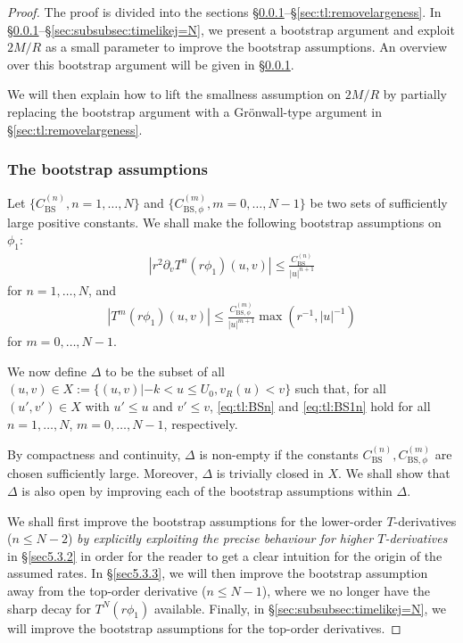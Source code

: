 \documentclass[11pt,english]{article}
\numberwithin{equation}{section}
\theoremstyle{remark}
\theoremstyle{plain}
\theoremstyle{remark}
\newcommand{\pv}{\partial_v}
\renewcommand{\(}{\left(}
\renewcommand{\)}{\right)}
\begin{document}
\begin{proof}
The proof is divided into the sections \S \ref{sec:tl:BS}--\S \ref{sec:tl:removelargeness}. 
 In \S \ref{sec:tl:BS}--\S \ref{sec:subsubsec:timelikej=N}, we present a bootstrap argument and exploit $2M/R$ as a small parameter to improve the bootstrap assumptions. 
 An overview over this bootstrap argument will be given in \S\ref{sec:tl:BS}.
 
We will then explain how to lift the smallness assumption on $2M/R$ by partially replacing the bootstrap argument with a Gr\"onwall-type argument in \S \ref{sec:tl:removelargeness}. 
\subsubsection{The bootstrap assumptions} \label{sec:tl:BS}
\newcommand{\cbs}{C_{\mathrm{BS}}}
\newcommand{\cbsp}{C_{\mathrm{BS},\phi}}
Let $\{\cbs^{(n)}, n=1,\dots,N\}$ and $\{\cbsp^{(m)},m=0,\dots,N-1\}$ be two sets of sufficiently large positive constants. We shall make the following bootstrap assumptions on $\phi_1$:
\begin{align}\tag{BS(n)}\label{eq:tl:BSn}
\left|r^2\pv T^n (r\phi_1)(u,v)\right|\leq \frac{\cbs^{(n)}}{|u|^{n+1}}
\end{align}
for $n=1,\dots,N$, and
\begin{align}\tag{BS'(m)}\label{eq:tl:BS1n}
\left|T^m (r\phi_1)(u,v)\right|\leq \frac{\cbsp^{(m)}}{|u|^{m+1}}\max\left(r^{-1},|u|^{-1}\right)
\end{align}
for $m=0,\dots,N-1$.

We now define $\Delta$ to be the subset of all $(u,v)\in X:= \{(u,v)|-k< u\leq U_0, v_R(u)< v\}$ such that, for all $(u',v')\in X$ with $u'\leq u$ and $v'\leq v$, \eqref{eq:tl:BSn} and \eqref{eq:tl:BS1n} hold for all $n=1,\dots,N$, $m=0,\dots,N-1$, respectively.

By compactness and continuity, $\Delta$ is non-empty if the constants $\cbs^{(n)},\cbsp^{(m)}$ are chosen sufficiently large.
 Moreover, $\Delta$ is trivially closed in $X$.
  We shall show that $\Delta$ is also open by improving each of the bootstrap assumptions within $\Delta$.

We shall first improve the bootstrap assumptions for the lower-order $T$-derivatives ($n\leq N-2$) \textit{by explicitly exploiting the precise behaviour for higher $T$-derivatives}  in \S \ref{sec5.3.2} in order for the reader to get a clear intuition for the origin of the assumed rates. 
In \S \ref{sec5.3.3}, we will then improve the bootstrap assumption away from the top-order derivative ($n\leq N-1$), where we no longer have the sharp decay for $T^N(r\phi_1)$ available. 
Finally, in \S \ref{sec:subsubsec:timelikej=N}, we will improve the bootstrap assumptions for the top-order derivatives.


\end{proof}
\end{document}
